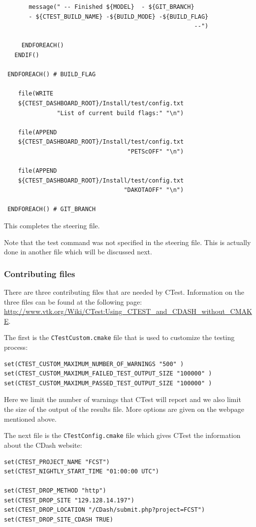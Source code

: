 \begin{lstlisting}
       message(" -- Finished ${MODEL}  - ${GIT_BRANCH}
       - ${CTEST_BUILD_NAME} -${BUILD_MODE} -${BUILD_FLAG}
                                                      --")

     ENDFOREACH()
   ENDIF()

 ENDFOREACH() # BUILD_FLAG

    file(WRITE
    ${CTEST_DASHBOARD_ROOT}/Install/test/config.txt
               "List of current build flags:" "\n")
    
    file(APPEND
    ${CTEST_DASHBOARD_ROOT}/Install/test/config.txt
                                   "PETScOFF" "\n")
                                   
    file(APPEND
    ${CTEST_DASHBOARD_ROOT}/Install/test/config.txt
                                  "DAKOTAOFF" "\n")

 ENDFOREACH() # GIT_BRANCH
\end{lstlisting}\normalsize

This completes the steering file.

Note that the test command was not specified in the steering file. This is actually done in another file which will be discussed next.

\subsubsection{Contributing files}

There are three contributing files that are needed by CTest. Information on the three files can be found at the following page:
\url{http://www.vtk.org/Wiki/CTest:Using_CTEST_and_CDASH_without_CMAKE}.

The first is the \verb!CTestCustom.cmake! file that is used to customize the testing process:

\small \begin{lstlisting}
set(CTEST_CUSTOM_MAXIMUM_NUMBER_OF_WARNINGS "500" )
set(CTEST_CUSTOM_MAXIMUM_FAILED_TEST_OUTPUT_SIZE "100000" )
set(CTEST_CUSTOM_MAXIMUM_PASSED_TEST_OUTPUT_SIZE "100000" )
\end{lstlisting}\normalsize

Here we limit the number of warnings that CTest will report and we also limit the size of the output of the results file. More options are given on the webpage mentioned above.

The next file is the \verb!CTestConfig.cmake! file which gives CTest the information about the CDash website:

\small \begin{lstlisting}
set(CTEST_PROJECT_NAME "FCST")
set(CTEST_NIGHTLY_START_TIME "01:00:00 UTC")

set(CTEST_DROP_METHOD "http")
set(CTEST_DROP_SITE "129.128.14.197")
set(CTEST_DROP_LOCATION "/CDash/submit.php?project=FCST")
set(CTEST_DROP_SITE_CDASH TRUE)
\end{lstlisting}\normalsize

